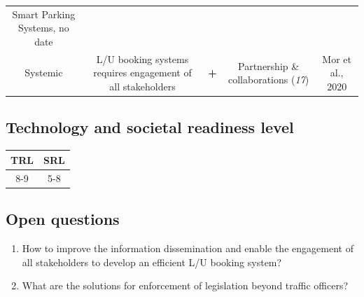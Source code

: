 \documentclass[
]{book}
\providecommand{\tightlist}{%
  \setlength{\itemsep}{0pt}\setlength{\parskip}{0pt}}
\begin{document}
\begin{longtable}[]{@{}ccccc@{}}
\begin{minipage}[t]{0.17\columnwidth}
Smart Parking Systems, no date\strut
\end{minipage}\tabularnewline
\begin{minipage}[t]{0.17\columnwidth}\centering
Systemic\strut
\end{minipage} & \begin{minipage}[t]{0.16\columnwidth}\centering
L/U booking systems requires engagement of all stakeholders\strut
\end{minipage} & \begin{minipage}[t]{0.17\columnwidth}\centering
\textbf{+}\strut
\end{minipage} & \begin{minipage}[t]{0.17\columnwidth}\centering
Partnership \& collaborations (\emph{17})\strut
\end{minipage} & \begin{minipage}[t]{0.17\columnwidth}\centering
Mor et al., 2020\strut
\end{minipage}\tabularnewline
\bottomrule
\end{longtable}

\hypertarget{technology-and-societal-readiness-level-32}{%
\subsection*{Technology and societal readiness level}\label{technology-and-societal-readiness-level-32}}

\begin{longtable}[]{@{}cc@{}}
\toprule
TRL & SRL\tabularnewline
\midrule
\endhead
8-9 & 5-8\tabularnewline
\bottomrule
\end{longtable}

\hypertarget{open-questions-32}{%
\subsection*{Open questions}\label{open-questions-32}}

\begin{enumerate}
\def\labelenumi{\arabic{enumi}.}
\tightlist
\item
  How to improve the information dissemination and enable the engagement of all stakeholders to develop an efficient L/U booking system?
\item
  What are the solutions for enforcement of legislation beyond traffic officers?
\end{enumerate}
\end{document}
